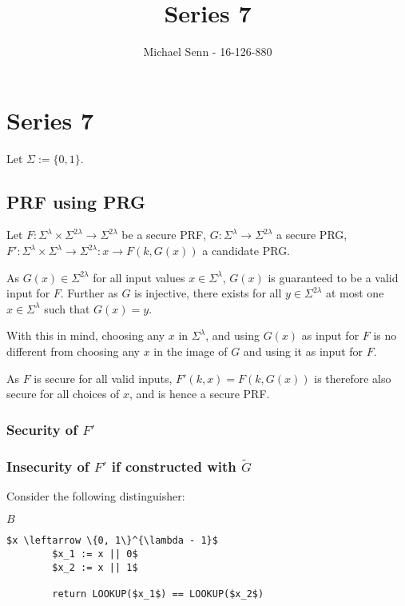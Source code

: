 \documentclass[a4paper]{scrreprt}
\title{Series 7}
\author{Michael Senn \maillink{michael.senn@students.unibe.ch} - 16-126-880}
\date{\printdate}
\begin{document}
\maketitle


\setcounter{chapter}{6}
\chapter{Series 7}

Let $\Sigma := \{0, 1\}$.

\section{PRF using PRG}

Let $F: \Sigma^\lambda \times \Sigma^{2 \lambda} \rightarrow \Sigma^{2
\lambda}$ be a secure PRF, $G: \Sigma^\lambda \rightarrow \Sigma^{2 \lambda}$ a
secure PRG, $F': \Sigma^\lambda \times \Sigma^\lambda \rightarrow \Sigma^{2
\lambda}: x \rightarrow F(k, G(x))$ a candidate PRG.

As $G(x) \in \Sigma^{2\lambda}$ for all input values $x \in \Sigma^\lambda$,
$G(x)$ is guaranteed to be a valid input for $F$. Further as $G$ is injective,
there exists for all $y \in \Sigma^{2 \lambda}$ at most one $x \in
\Sigma^\lambda$ such that $G(x) = y$.

With this in mind, choosing any $x$ in $\Sigma^\lambda$, and using $G(x)$ as
input for $F$ is no different from choosing any $x$ in the image of $G$ and
using it as input for $F$.

As $F$ is secure for all valid inputs, $F'(k, x) = F(k, G(x))$ is therefore
also secure for all choices of $x$, and is hence a secure PRF.

\subsection{Security of $F'$}


\subsection{Insecurity of $F'$ if constructed with $\tilde{G}$} 

Consider the following distinguisher:

\begin{library}{$B$}
	\begin{lstlisting}[mathescape=true]
		$x \leftarrow \{0, 1\}^{\lambda - 1}$
		$x_1 := x || 0$
		$x_2 := x || 1$

		return LOOKUP($x_1$) == LOOKUP($x_2$)
	\end{lstlisting}
\end{library}
\end{document}
